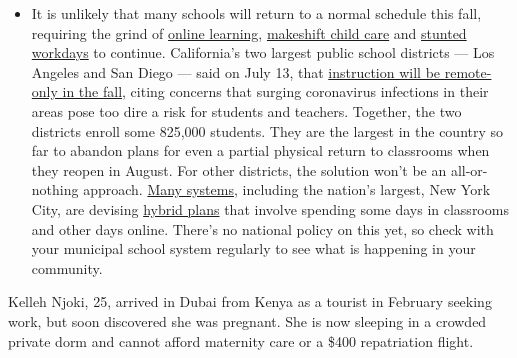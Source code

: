 \begin{itemize}
  \begin{itemize}
  \tightlist
  \item
    It is unlikely that many schools will return to a normal schedule
    this fall, requiring the grind of
    \href{https://www.nytimes3xbfgragh.onion/2020/06/05/us/coronavirus-education-lost-learning.html?action=click\&pgtype=Article\&state=default\&region=MAIN_CONTENT_3\&context=storylines_faq}{online
    learning},
    \href{https://www.nytimes3xbfgragh.onion/2020/05/29/us/coronavirus-child-care-centers.html?action=click\&pgtype=Article\&state=default\&region=MAIN_CONTENT_3\&context=storylines_faq}{makeshift
    child care} and
    \href{https://www.nytimes3xbfgragh.onion/2020/06/03/business/economy/coronavirus-working-women.html?action=click\&pgtype=Article\&state=default\&region=MAIN_CONTENT_3\&context=storylines_faq}{stunted
    workdays} to continue. California's two largest public school
    districts --- Los Angeles and San Diego --- said on July 13, that
    \href{https://www.nytimes3xbfgragh.onion/2020/07/13/us/lausd-san-diego-school-reopening.html?action=click\&pgtype=Article\&state=default\&region=MAIN_CONTENT_3\&context=storylines_faq}{instruction
    will be remote-only in the fall}, citing concerns that surging
    coronavirus infections in their areas pose too dire a risk for
    students and teachers. Together, the two districts enroll some
    825,000 students. They are the largest in the country so far to
    abandon plans for even a partial physical return to classrooms when
    they reopen in August. For other districts, the solution won't be an
    all-or-nothing approach.
    \href{https://bioethics.jhu.edu/research-and-outreach/projects/eschool-initiative/school-policy-tracker/}{Many
    systems}, including the nation's largest, New York City, are
    devising
    \href{https://www.nytimes3xbfgragh.onion/2020/06/26/us/coronavirus-schools-reopen-fall.html?action=click\&pgtype=Article\&state=default\&region=MAIN_CONTENT_3\&context=storylines_faq}{hybrid
    plans} that involve spending some days in classrooms and other days
    online. There's no national policy on this yet, so check with your
    municipal school system regularly to see what is happening in your
    community.
  \end{itemize}
\end{itemize}

Kelleh Njoki, 25, arrived in Dubai from Kenya as a tourist in February
seeking work, but soon discovered she was pregnant. She is now sleeping
in a crowded private dorm and cannot afford maternity care or a \$400
repatriation flight.

